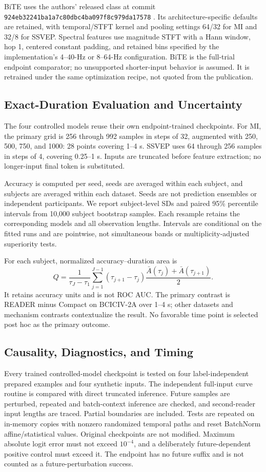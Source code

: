 \documentclass[conference]{IEEEtran}
\begin{document}
BiTE uses the authors' released class at commit
\texttt{924eb32241ba1a7c80dbc4ba097f8c979da17578}
\cite{hong2025bitecode}. Its architecture-specific defaults are retained,
with temporal/STFT kernel and pooling settings 64/32 for MI and 32/8 for
SSVEP. Spectral features use magnitude STFT with a Hann window, hop 1,
centered constant padding, and retained bins specified by the implementation's
4--40-Hz or 8--64-Hz configuration. BiTE is the full-trial endpoint comparator;
no unsupported shorter-input behavior is assumed. It is retrained under the
same optimization recipe, not quoted from the publication.

\subsection{Exact-Duration Evaluation and Uncertainty}
The four controlled models reuse their own endpoint-trained checkpoints.
For MI, the primary grid is 256 through 992 samples in steps of 32, augmented
with 250, 500, 750, and 1000: 28 points covering 1--4 s. SSVEP uses 64 through
256 samples in steps of 4, covering 0.25--1 s. Inputs are truncated before
feature extraction; no longer-input final token is substituted.

Accuracy is computed per seed, seeds are averaged within each subject, and
subjects are averaged within each dataset. Seeds are not prediction ensembles
or independent participants. We report subject-level SDs and paired
95\% percentile intervals from 10,000 subject bootstrap samples. Each
resample retains the corresponding models and all observation lengths.
Intervals are conditional on the fitted runs and are pointwise, not
simultaneous bands or multiplicity-adjusted superiority tests.

For each subject, normalized accuracy--duration area is
\begin{equation}
Q=\frac{1}{\tau_J-\tau_1}\sum_{j=1}^{J-1}
(\tau_{j+1}-\tau_j)\frac{\bar A(\tau_j)+\bar A(\tau_{j+1})}{2}.
\end{equation}
It retains accuracy units and is not ROC AUC. The primary contrast is
READER minus Compact on BCICIV-2A over 1--4 s; other datasets and mechanism
contrasts contextualize the result. No favorable time point is selected
post hoc as the primary outcome.

\subsection{Causality, Diagnostics, and Timing}
Every trained controlled-model checkpoint is tested on four label-independent
prepared examples and four synthetic inputs. The independent full-input
curve routine is compared with direct truncated inference. Future samples
are perturbed, repeated and batch-context inference are checked, and second-reader
input lengths are traced. Partial boundaries are included. Tests are repeated
on in-memory copies with nonzero randomized temporal paths and reset
BatchNorm affine/statistical values. Original checkpoints are not modified.
Maximum absolute logit error must not exceed $10^{-4}$, and a deliberately
future-dependent positive control must exceed it. The endpoint has no future
suffix and is not counted as a future-perturbation success.
\end{document}
